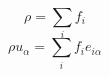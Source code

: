 \documentclass[12pt]{article}
\begin{document}
$$ 
\rho = \displaystyle\sum\limits_{i} f_i
$$
$$
\rho u_{\alpha} = \displaystyle\sum\limits_{i} f_i e_{i\alpha}
$$
\end{document}
